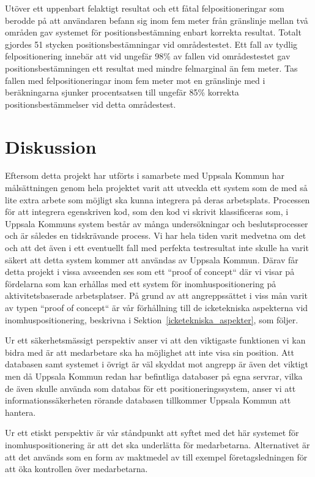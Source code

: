 \documentclass[a4paper,12pt]{article}
\begin{document}
 Utöver ett uppenbart felaktigt resultat och ett fåtal felpositioneringar som berodde på att användaren befann sig inom fem meter från gränslinje mellan två områden gav systemet för positionsbestämning enbart korrekta resultat. Totalt gjordes 51 stycken positionsbestämningar vid områdestestet. Ett fall av tydlig felpositionering innebär att vid ungefär 98\% av fallen vid områdestestet gav positionsbestämningen ett resultat med mindre felmarginal än fem meter. Tas fallen med felpositioneringar inom fem meter mot en gränslinje med i beräkningarna sjunker procentsatsen till ungefär 85\% korrekta positionsbestämmelser vid detta områdestest.

\section{Diskussion}
Eftersom detta projekt har utförts i samarbete med Uppsala Kommun har målsättningen genom hela projektet varit att utveckla ett system som de med så lite extra arbete som möjligt ska kunna integrera på deras arbetsplats. Processen för att integrera egenskriven kod, som den kod vi skrivit klassificeras som, i Uppsala Kommuns system består av många undersökningar och beslutsprocesser och är således en tidskrävande process. Vi har hela tiden varit medvetna om det och att det även i ett eventuellt fall med perfekta testresultat inte skulle ha varit säkert att detta system kommer att användas av Uppsala Kommun. Därav får detta projekt i vissa avseenden ses som ett ``proof of concept`` där vi visar på fördelarna som kan erhållas med ett system för inomhuspositionering på aktivitetsbaserade arbetsplatser. På grund av att angreppssättet i viss mån varit av typen ``proof of concept`` är vår förhållning till de icketekniska aspekterna vid inomhuspositionering, beskrivna i Sektion~\ref{icketekniska_aspekter}, som följer.

Ur ett säkerhetsmässigt perspektiv anser vi att den viktigaste funktionen vi kan bidra med är att medarbetare ska ha möjlighet att inte visa sin position. Att databasen samt systemet i övrigt är väl skyddat mot angrepp är även det viktigt men då Uppsala Kommun redan har befintliga databaser på egna servrar, vilka de även skulle använda som databas för ett positioneringssystem, anser vi att informationssäkerheten rörande databasen tillkommer Uppsala Kommun att hantera.

Ur ett etiskt perspektiv är vår ståndpunkt att syftet med det här systemet för inomhuspositionering är att det ska underlätta för medarbetarna. Alternativet är att det används som en form av maktmedel av till exempel företagsledningen för att öka kontrollen över medarbetarna.
\end{document}
